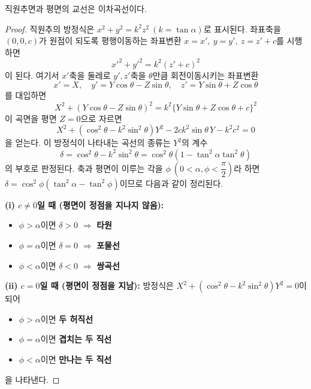 \documentclass{article}
\theoremstyle{mystyle}
\begin{document}
\begin{tcolorbox}[colback=red!4,
    colframe=red!60!black,
    title=직원추면과 평면의 교선,
    fonttitle=\bfseries,
    boxrule=0.5mm,
    arc=3mm]
직원추면과 평면의 교선은 이차곡선이다.
\end{tcolorbox}

\begin{proof}
직원추의 방정식은 \(x^2+y^2=k^2z^2\ (k=\tan\alpha)\)로 표시된다. 좌표축을 \((0,0,c)\)가 원점이 되도록 평행이동하는 좌표변환 \(x=x',\ y=y',\ z=z'+c\)를 시행하면
\[
x'^2+y'^2=k^2(z'+c)^2
\]
이 된다. 여기서 \(x'\)축을 둘레로 \(y',z'\)축을 \(\theta\)만큼 회전이동시키는 좌표변환
\[
x'=X,\quad y'=Y\cos\theta-Z\sin\theta,\quad z'=Y\sin\theta+Z\cos\theta
\]
를 대입하면
\[
X^2+(Y\cos\theta-Z\sin\theta)^2=k^2\{Y\sin\theta+Z\cos\theta+c\}^2
\]
이 곡면을 평면 \(Z=0\)으로 자르면
\[
X^2+(\cos^2\theta-k^2\sin^2\theta)Y^2-2ck^2\sin\theta\,Y-k^2c^2=0
\]
을 얻는다. 이 방정식이 나타내는 곡선의 종류는 \(Y^2\)의 계수
\[
\delta=\cos^2\theta-k^2\sin^2\theta=\cos^2\theta(1-\tan^2\alpha\tan^2\theta)
\]
의 부호로 판정된다. 축과 평면이 이루는 각을 \(\phi\ \left(0<\alpha,\phi<\dfrac{\pi}{2}\right)\)라 하면 \(\delta=\cos^2\phi(\tan^2\alpha-\tan^2\phi)\)이므로 다음과 같이 정리된다.

\textbf{(i) \(c\ne0\)일 때 (평면이 정점을 지나지 않음):}
\begin{itemize}
    \item \(\phi>\alpha\)이면 \(\delta>0\) $\Rightarrow$ \textbf{타원}
    \item \(\phi=\alpha\)이면 \(\delta=0\) $\Rightarrow$ \textbf{포물선}
    \item \(\phi<\alpha\)이면 \(\delta<0\) $\Rightarrow$ \textbf{쌍곡선}
\end{itemize}

\textbf{(ii) \(c=0\)일 때 (평면이 정점을 지남):} 방정식은 \(X^2+(\cos^2\theta-k^2\sin^2\theta)Y^2=0\)이 되어
\begin{itemize}
    \item \(\phi>\alpha\)이면 \textbf{두 허직선}
    \item \(\phi=\alpha\)이면 \textbf{겹치는 두 직선}
    \item \(\phi<\alpha\)이면 \textbf{만나는 두 직선}
\end{itemize}
을 나타낸다.
\end{proof}
\end{document}
